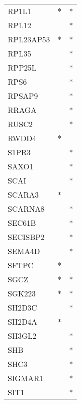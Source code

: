 \begin{longtable}{lcc}
RP1L1                 &              * &          * \\
RPL12                 &                &          * \\
RPL23AP53             &              * &          * \\
RPL35                 &                &          * \\
RPP25L                &                &          * \\
RPS6                  &                &          * \\
RPSAP9                &                &          * \\
RRAGA                 &                &          * \\
RUSC2                 &                &          * \\
RWDD4                 &              * &            \\
S1PR3                 &                &          * \\
SAXO1                 &                &          * \\
SCAI                  &                &          * \\
SCARA3                &              * &            \\
SCARNA8               &                &          * \\
SEC61B                &                &          * \\
SECISBP2              &                &          * \\
SEMA4D                &                &          * \\
SFTPC                 &              * &            \\
SGCZ                  &              * &          * \\
SGK223                &              * &          * \\
SH2D3C                &                &          * \\
SH2D4A                &              * &            \\
SH3GL2                &                &          * \\
SHB                   &                &          * \\
SHC3                  &                &          * \\
SIGMAR1               &                &          * \\
SIT1                  &                &          * \\

\end{longtable}
